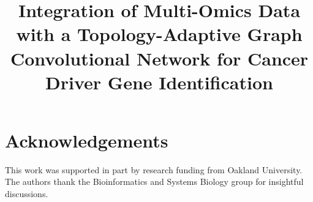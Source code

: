 \documentclass[onecolumn]{IEEEtran}
\begin{document}
	
	\title{Integration of Multi-Omics Data with a Topology-Adaptive Graph Convolutional Network for Cancer Driver Gene Identification}
	
	\author{
	}
	
	\maketitle
	
	\section*{Acknowledgements}
	This work was supported in part by research funding from Oakland University. The authors thank the Bioinformatics and Systems Biology group for insightful discussions.
	
\end{document}
